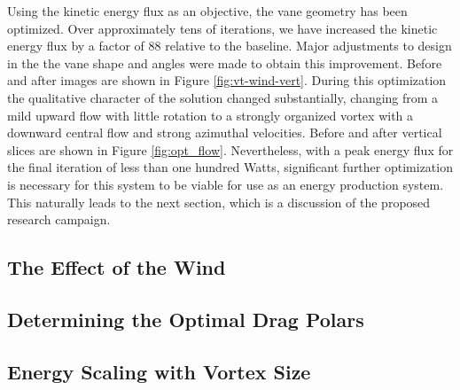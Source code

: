 %
%
%

Using the kinetic energy flux as an objective, the vane geometry has
been optimized. Over approximately tens of iterations, we have
increased the kinetic energy flux by a factor of 88 relative to the
baseline. 
Major adjustments to design in the the vane
shape and angles were made to obtain this improvement. Before and after
images are shown in Figure \ref{fig:vt-wind-vert}. During this
optimization the 
qualitative character of the solution changed substantially, changing
from a mild upward flow with little rotation to a strongly organized
vortex with a downward central flow and strong azimuthal
velocities. Before and after vertical slices are shown in Figure
\ref{fig:opt_flow}. Nevertheless, with a peak energy flux for the final 
iteration of less than one hundred Watts, significant further
optimization is necessary for this system to be viable for use as an 
energy production system. This naturally leads to the next section,
which is a discussion of the proposed research campaign. 

\subsection{The Effect of the Wind}

\subsection{Determining the Optimal Drag Polars}

\subsection{Energy Scaling with Vortex Size}

